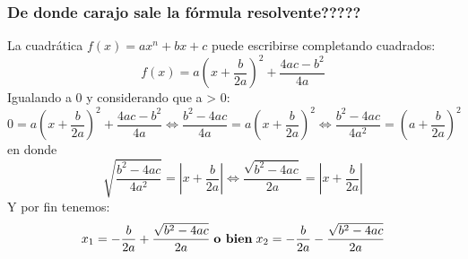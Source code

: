 \subsubsection{De donde carajo sale la fórmula resolvente?????}
La cuadrática $f(x) = ax^n + bx + c$ puede escribirse completando cuadrados:
$$f(x) = a\left(x + \frac{b}{2a} \right)^2 + \frac{4ac-b^2}{4a}$$
Igualando a 0 y considerando que a > 0:
$$0 = a \left(x + \frac{b}{2a}\right)^2 + \frac{4ac-b^2}{4a} \Leftrightarrow \frac{b^2 -4ac}{4a} = a \left(x + \frac{b}{2a}\right)^2 \Leftrightarrow \frac{b^2 - 4ac}{4a^2} = \left(a + \frac{b}{2a}\right)^2$$
en donde
$$\sqrt{\frac{b^2 - 4ac}{4a^2}} = \left| x+\frac{b}{2a} \right| \Leftrightarrow \frac{\sqrt{b^2 - 4ac}}{2a} = \left| x + \frac{b}{2a} \right|$$
Y por fin tenemos:
$$x_1 = -\frac{b}{2a} + \frac{\sqrt{b^2-4ac}}{2a} \; \text{\textbf{o bien}} \; x_2 = -\frac{b}{2a} - \frac{\sqrt{b^2 - 4ac}}{2a}$$

